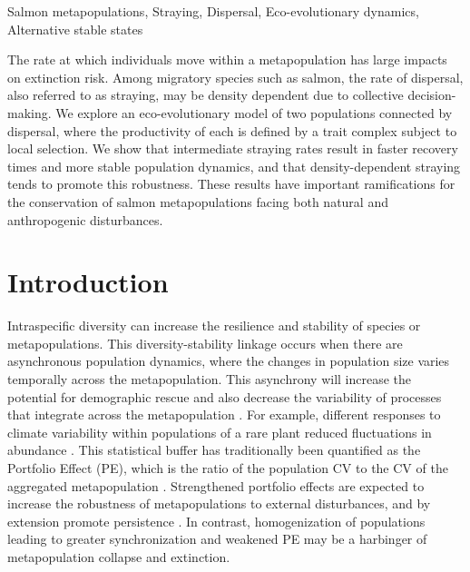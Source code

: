 \documentclass{revtex4}
\begin{document}
\centerline{Salmon metapopulations, Straying, Dispersal, Eco-evolutionary dynamics, Alternative stable states}
\vspace{2mm}
 The rate at which individuals move within a metapopulation has large impacts on extinction risk. Among migratory species such as salmon, the rate of dispersal, also referred to as straying, may be density dependent due to collective decision-making. We explore an eco-evolutionary model of two populations connected by dispersal, where the productivity of each is defined by a trait complex subject to local selection. We show that intermediate straying rates result in faster recovery times and more stable population dynamics, and that density-dependent straying tends to promote this robustness. These results have important ramifications for the conservation of salmon metapopulations facing both natural and anthropogenic disturbances.\\


\section{Introduction}

Intraspecific diversity can increase the resilience and stability of species or metapopulations. 
This diversity-stability linkage occurs when there are asynchronous population dynamics, where the changes in population size varies temporally across the metapopulation. 
This asynchrony will increase the potential for demographic rescue \citep{Brown:1977gk,Earn:2000fm} and also decrease the variability of processes that integrate across the metapopulation \citep{Anonymous:2015gf}. 
For example, different responses to climate variability within populations of a rare plant reduced fluctuations in abundance \citep{Abbott:2017hl}. 
This statistical buffer has traditionally been quantified as the Portfolio Effect (PE), which is the ratio of the population CV to the CV of the aggregated metapopulation \citep{Thibaut:2012km}. 
Strengthened portfolio effects are expected to increase the robustness of metapopulations to external disturbances, and by extension promote persistence \citep{Thibaut:2012km}.
In contrast, homogenization of populations leading to greater synchronization and weakened PE may be a harbinger of metapopulation collapse and extinction.
\end{document}
